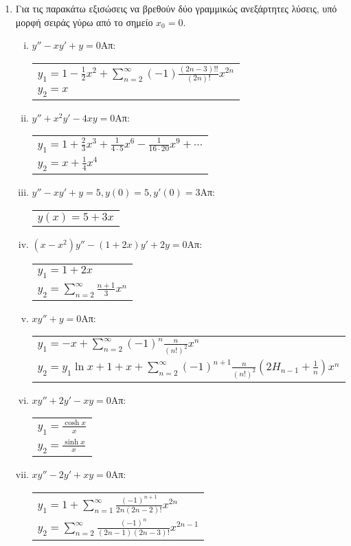 \begin{enumerate}
\item Για τις παρακάτω εξισώσεις να βρεθούν δύο γραμμικώς ανεξάρτητες λύσεις, υπό μορφή σειράς γύρω από το σημείο $x_0=0$.
\begin{enumerate}[i)]
\item $y''-xy'+y=0$\hfill Απ: \begin{tabular}[t]{l}
$y_1=1-\frac{1}{2}x^2+\sum\limits_{n=2}^{\infty}(-1)\frac{(2n-3)!!}{(2n)!}x^{2n}$\\
$y_2=x$
\end{tabular}
\item $y''+x^2y'-4xy=0$\hfill Απ:\begin{tabular}[t]{l}$y_1=1+\frac{2}{3}x^3+\frac{1}{4\cdot 5}x^6-\frac{1}{16\cdot 20}x^9+\cdots$ \\[5pt]
$y_2=x+\frac{1}{4}x^4$
\end{tabular}
\item $y''-xy'+y=5, y(0)=5, y'(0)=3$\hfill Απ: \begin{tabular}[t]{l}
$y(x)=5+3x$
\end{tabular}
\item $(x-x^2)y''-(1+2x)y'+2y=0$\hfill Απ: \begin{tabular}[t]{l}
$y_1=1+2x$\\
$y_2=\sum\limits_{n=2}^{\infty}\frac{n+1}{3}x^n$
\end{tabular}
\item $xy''+y=0$\hfill Απ: \begin{tabular}[t]{l}
$y_1=-x+\sum\limits_{n=2}^{\infty}(-1)^n\frac{n}{(n!)^2}x^n$\\
$y_2=y_1\ln x+1+x+\sum\limits_{n=2}^{\infty}(-1)^{n+1}\frac{n}{(n!)^2}(2H_{n-1}+\frac{1}{n})x^n$
\end{tabular}
\item $xy''+2y'-xy=0$\hfill Απ: \begin{tabular}[t]{l}
$y_1=\frac{\cosh x}{x}$\\
$y_2=\frac{\sinh x}{x}$
\end{tabular}
\item $xy''-2y'+xy=0$\hfill Απ: \begin{tabular}[t]{l}
$y_1=1+\sum\limits_{n=1}^{\infty}\frac{(-1)^{n+1}}{2n(2n-2)!}x^{2n}$\\
$y_2=\sum\limits_{n=2}^{\infty}\frac{(-1)^n}{(2n-1)(2n-3)!}x^{2n-1}$
\end{tabular}


\end{enumerate}

\end{enumerate}



